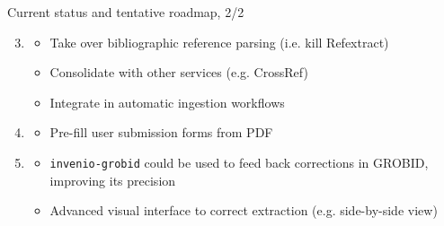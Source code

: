 \documentclass[10pt]{beamer}
\begin{document}
  \begin{frame}{Current status and tentative roadmap, 2/2}
    \begin{enumerate}
      \setcounter{enumi}{2}
      \setlength\itemsep{0.25cm}
      \item \begin{itemize}
              \item Take over bibliographic reference parsing (i.e. kill Refextract)
	      \item Consolidate with other services (e.g. CrossRef)
	      \item Integrate in automatic ingestion workflows
            \end{itemize}
      \item \begin{itemize}
              \item Pre-fill user submission forms from PDF
            \end{itemize}
      \item \begin{itemize}
              \item \texttt{invenio-grobid} could be used to feed back corrections in GROBID, improving its precision
              \item Advanced visual interface to correct extraction (e.g. side-by-side view)
            \end{itemize}
    \end{enumerate}
  \end{frame}
\end{document}
